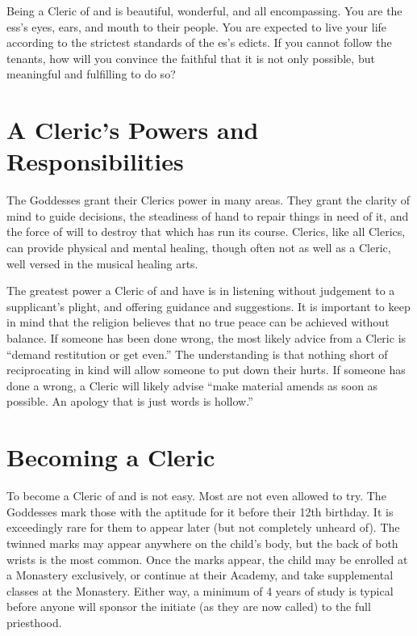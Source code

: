 \documentclass[blue]{GL2020}
\begin{document}
\name{\bLeauCleric{}}

Being a Cleric of \cEbb{\full} and \cFlow{\full} is beautiful, wonderful, and all encompassing. You are the \cEbb{\God}ess's eyes, ears, and mouth to their people. You are expected to live your life according to the strictest standards of the \cEbb{\God}es's edicts. If you cannot follow the tenants, how will you convince the faithful that it is not only possible, but meaningful and fulfilling to do so?

\section{A Cleric's Powers and Responsibilities}
The Goddesses grant their Clerics power in many areas. They grant the clarity of mind to guide decisions, the steadiness of hand to repair things in need of it, and the force of will to destroy that which has run its course. \pShip{} Clerics, like all Clerics, can provide physical and mental healing, though often not as well as a \pFarm{} Cleric, well versed in the musical healing arts.

The greatest power a Cleric of \cEbb{} and \cFlow{} have is in listening without judgement to a supplicant's plight, and offering guidance and suggestions. It is important to keep in mind that the \pShip{} religion believes that no true peace can be achieved without balance. If someone has been done wrong, the most likely advice from a Cleric is ``demand restitution or get even.'' The understanding is that nothing short of reciprocating in kind will allow someone to put down their hurts. If someone has done a wrong, a Cleric will likely advise ``make material amends as soon as possible. An apology that is just words is hollow.''

\section{Becoming a Cleric}
To become a Cleric of \cEbb{} and \cFlow{} is not easy. Most are not even allowed to try. The Goddesses mark those with the aptitude for it before their 12th birthday. It is exceedingly rare for them to appear later (but not completely unheard of). The twinned marks may appear anywhere on the child's body, but the back of both wrists is the most common. Once the marks appear, the child may be enrolled at a Monastery exclusively, or continue at their Academy, and take supplemental classes at the Monastery. Either way, a minimum of 4 years of study is typical before anyone will sponsor the initiate (as they are now called) to the full priesthood.
\end{document}

